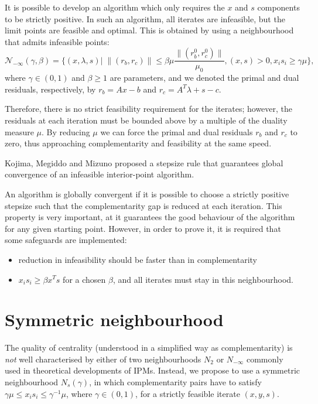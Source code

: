 It is possible to develop an algorithm which only requires 
the $x$ and $s$ components to be strictly positive. In such 
an algorithm, all iterates are infeasible, but the limit points 
are feasible and optimal. This is obtained by using a 
neighbourhood that admits infeasible points:
\[
\mathcal{N}_{-\infty}(\gamma,\beta) =\{ (x,\lambda,s) | \; \|(r_b,r_c)\| \le \beta\mu \frac{\|(r_b^0,r_c^0)\|}{\mu_0}, (x,s)>0, x_is_i \ge \gamma\mu \},
\]
where $\gamma\in (0,1)$ and $\beta \ge 1$ are parameters, and 
we denoted the primal and dual residuals, respectively, by 
$r_b = Ax-b$ and $r_c = A^T\lambda+s-c$.

Therefore, there is no strict feasibility requirement for 
the iterates; however, the residuals at each iteration must be 
bounded above by a multiple of the duality measure $\mu$. 
By reducing $\mu$ we can force the primal and dual residuals 
$r_b$ and $r_c$ to zero, thus approaching complementarity and 
feasibility at the same speed.

\hrulefill

Kojima, Megiddo and Mizuno \cite{KojimaMegiddoMizuno} proposed 
a stepsize rule that guarantees global convergence of an 
infeasible interior-point algorithm.

An algorithm is globally convergent if it is possible to choose
a strictly positive stepsize such that the complementarity gap
is reduced at each iteration. This property is very important, at it
guarantees the good behaviour of the algorithm for any given starting
point. However, in order to prove it, it is required that some
safeguards are implemented:
\begin{itemize}
\item reduction in infeasibility should be faster than in complementarity
\item $x_i s_i \ge \beta x^Ts$ for a chosen $\beta$, and all iterates must
stay in this neighbourhood.
\end{itemize}

%
%
\section{Symmetric neighbourhood}
\label{sec:SymNeighbourhood}

The quality of centrality (understood in a simplified way as complementarity)
is {\it not} well characterised by either of two neighbourhoods 
$N_2$ or $N_{-\infty}$ commonly used in theoretical developments of IPMs.
Instead, we propose to use a symmetric neighbourhood $N_s(\gamma)$,
in which complementarity pairs have to satisfy 
$\gamma \mu \leq x_i s_i \leq \gamma^{-1} \mu$, where $\gamma \in (0,1)$, 
for a strictly feasible iterate $(x,y,s)$.

